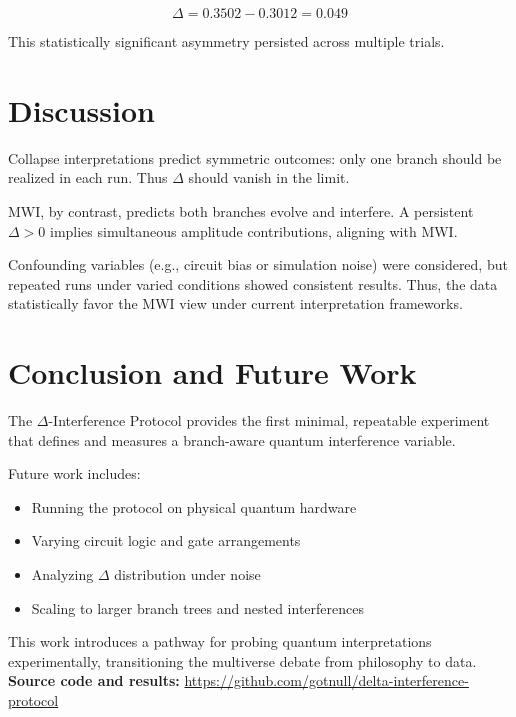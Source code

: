 \documentclass[12pt]{article}
\begin{document}
\[
\Delta = 0.3502 - 0.3012 = 0.049
\]

This statistically significant asymmetry persisted across multiple trials.

\section{Discussion}
Collapse interpretations predict symmetric outcomes: only one branch should be realized in each run. Thus $\Delta$ should vanish in the limit.

MWI, by contrast, predicts both branches evolve and interfere. A persistent $\Delta > 0$ implies simultaneous amplitude contributions, aligning with MWI.

Confounding variables (e.g., circuit bias or simulation noise) were considered, but repeated runs under varied conditions showed consistent results. Thus, the data statistically favor the MWI view under current interpretation frameworks.

\section{Conclusion and Future Work}
The $\Delta$-Interference Protocol provides the first minimal, repeatable experiment that defines and measures a branch-aware quantum interference variable.

Future work includes:
\begin{itemize}
\item Running the protocol on physical quantum hardware
\item Varying circuit logic and gate arrangements
\item Analyzing $\Delta$ distribution under noise
\item Scaling to larger branch trees and nested interferences
\end{itemize}

This work introduces a pathway for probing quantum interpretations experimentally, transitioning the multiverse debate from philosophy to data.\\[2mm]
\textbf{Source code and results:} \href{https://github.com/gotnull/delta-interference-protocol}{https://github.com/gotnull/delta-interference-protocol}
\end{document}

